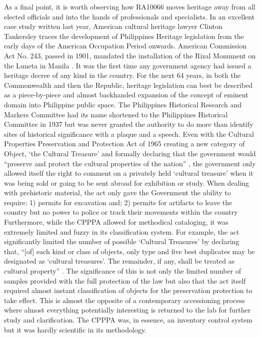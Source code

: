 As a final point, it is worth observing how RA10066 moves heritage away from all elected officials and into the hands of professionals and specialists.  In an excellent case study written last year, American cultural heritage lawyer Clinton Tankersley traces the development of Philippines Heritage legislation from the early days of the American Occupation Period onwards. American Commission Act No. 243, passed in 1901, mandated the installation of the Rizal Monument on the Luneta in Manila \parencite{Tankersley_2014}. 
It was the first time any government agency had issued a heritage decree of any kind in the country.  For the next 64 years, in both the Commonwealth and then the Republic, heritage legislation can best be described as a piece-by-piece and almost backhanded expansion of the concept of eminent domain into Philippine public space. The Philippines Historical Research and Markers Committee had its name shortened to the Philippines Historical Committee in 1937 but was never granted the authority to do more than identify sites of historical significance with a plaque and a speech. Even with the Cultural Properties Preservation and Protection Act of 1965 \parencite{RA4886} creating a new category of Object, ‘the Cultural Treasure’ and formally declaring that the government would “preserve and protect the cultural properties of the nation” \parencite[1]{RA4886}, 
the government only allowed itself the right to comment on a privately held ‘cultural treasure’ when it was being sold or going to be sent abroad for exhibition or study. When dealing with prehistoric material, the act only gave the Government the ability to require: 1) permits for excavation and; 2) permits for artifacts to leave the country but no power to police or track their movements within the country \parencite[3]{RA4886} Furthermore, while the CPPPA allowed for methodical cataloging, it was extremely limited and fuzzy in its classification system. 
For example, the act significantly limited the number of possible ‘Cultural Treasures’ by declaring that, “[of] each kind or class of objects, only type and five best duplicates may be designated as ‘cultural treasures’. The remainder, if any, shall be treated as cultural property” \parencite[6]{RA4886}. The significance of this is not only the limited number of samples provided with the full protection of the law but also that the act itself required almost instant classification of objects for the preservation protection to take effect. This is almost the opposite of a contemporary accessioning process where almost everything potentially interesting is returned to the lab for further study and clarification. The CPPPA was, in essence, an inventory control system but it was hardly scientific in its methodology.

